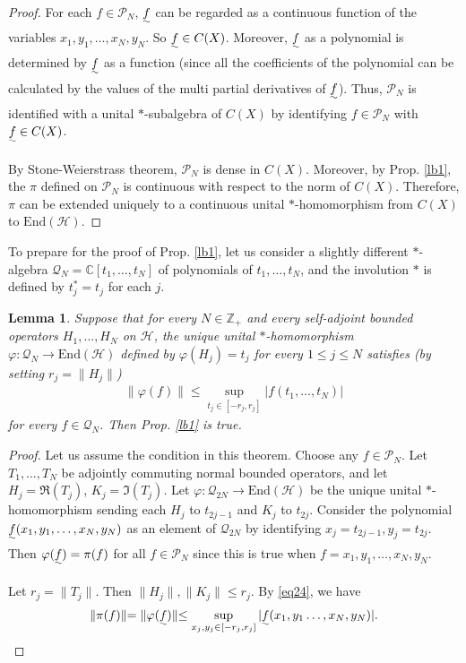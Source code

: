 \documentclass[12pt,a4paper,notitlepage]{article}
\theoremstyle{definition}
\theoremstyle{plain}
\newtheorem{lm}[df]{Lemma}
\newcommand{\mc}{\mathcal}
\newcommand{\End}{\mathrm{End}} %
\newcommand{\Cbb}{\mathbb C}
\newcommand{\Zbb}{\mathbb Z}
\numberwithin{equation}{section}
\begin{document}
\begin{proof}
For each  $f\in\mc P_N$, $\uwave f$ can be regarded as a continuous function of the variables $x_1,y_1,\dots,x_N,y_N$. So $\uwave f\in C(X)$. Moreover, $\uwave f$ as a polynomial is determined by $\uwave f$ as a function (since all the coefficients of the polynomial can be calculated by the values of the multi partial derivatives of $\uwave f$). Thus, $\mc P_N$ is identified with a unital $*$-subalgebra of $C(X)$ by identifying $f\in\mc P_N$ with $\uwave f\in C(X)$.

By Stone-Weierstrass theorem, $\mc P_N$ is dense in $C(X)$. Moreover, by Prop. \ref{lb1}, the $\pi$ defined on $\mc P_N$ is continuous with respect to the norm of $C(X)$. Therefore, $\pi$ can be extended uniquely to a continuous unital $*$-homomorphism from $C(X)$ to $\End(\mc H)$.
\end{proof}


To prepare for the proof of Prop. \ref{lb1}, let us consider a slightly different $*$-algebra $\mc Q_N=\Cbb[t_1,\dots,t_N]$ of polynomials of $t_1,\dots,t_N$, and the involution $*$ is defined by $t_j^*=t_j$ for each $j$. 

\begin{lm}\label{lb69}
Suppose that for every $N\in\Zbb_+$ and every self-adjoint bounded operators $H_1,\dots,H_N$ on $\mc H$, the unique unital $*$-homomorphism $\varphi:\mc Q_N\rightarrow\End(\mc H)$ defined by $\varphi(H_j)=t_j$ for every $1\leq j\leq N$ satisfies (by setting $r_j=\lVert H_j\lVert$)
\begin{align}
\lVert \varphi(f)\lVert \leq\sup_{t_j\in[-r_j,r_j]}|f(t_1,\dots,t_N)|\label{eq24}
\end{align}
for every $f\in\mc Q_N$. Then Prop. \ref{lb1} is true.
\end{lm}

\begin{proof}
Let us assume the condition in this theorem. Choose any $f\in\mc P_N$. Let $T_1,\dots,T_N$ be adjointly commuting normal bounded operators, and let $H_j=\Re(T_j)$, $K_j=\Im(T_j)$. Let $\varphi:\mc Q_{2N}\rightarrow\End(\mc H)$ be the unique unital $*$-homomorphism sending each $H_j$ to $t_{2j-1}$ and $K_j$ to $t_{2j}$. Consider the polynomial $\uwave f(x_1,y_1,\dots,x_N,y_N)$ as an element of $\mc Q_{2N}$ by identifying $x_j=t_{2j-1},y_j=t_{2j}$. Then $\varphi(\uwave f)=\pi(f)$ for all $f\in\mc P_N$ since this is true when $f=x_1,y_1,\dots,x_N,y_N$.

Let $r_j=\lVert T_j\lVert$. Then $\lVert H_j\lVert,\lVert K_j\lVert\leq r_j$. By \eqref{eq24}, we have
\begin{align*}
\lVert\pi(f)\lVert=\lVert \varphi(\uwave f)\lVert \leq\sup_{x_j,y_j\in[-r_j,r_j]}|\uwave f(x_1,y_1\dots,x_N,y_N)|.	
\end{align*}
\end{proof}
\end{document}
